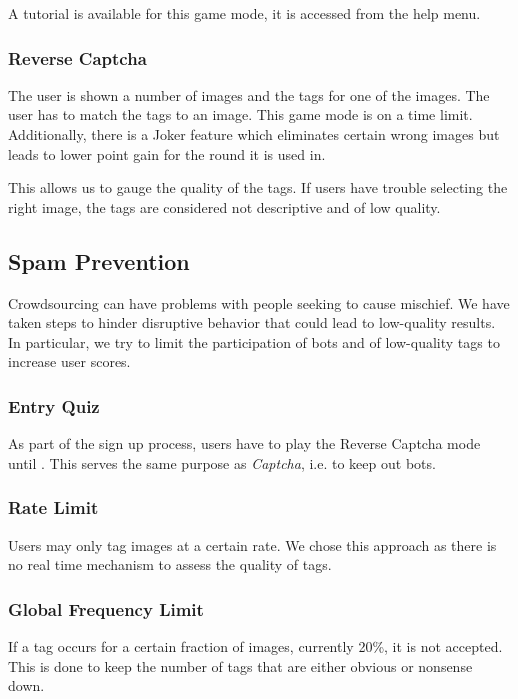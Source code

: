 A tutorial is available for this game mode, it is accessed from the help menu.

\subsubsection{Reverse Captcha}

The user is shown a number of images and the tags for one of the images. The user has to match the tags to an image.
This game mode is on a time limit. Additionally, there is a Joker feature which eliminates certain wrong images but leads to lower point gain for the round it is used in.

This allows us to gauge the quality of the tags. If users have trouble selecting the right image, the tags are considered not descriptive and of low quality.


\subsection{Spam Prevention}

Crowdsourcing can have problems with people seeking to cause mischief. We have taken steps to hinder disruptive behavior that could lead to low-quality results. In particular, we try to limit the participation of bots and  of low-quality tags to increase user scores.


\subsubsection{Entry Quiz}

As part of the sign up process, users have to play the Reverse Captcha mode until . This serves the same purpose as \textit{Captcha}, i.e. to keep out bots.


\subsubsection{Rate Limit}
Users may only tag images at a certain rate. We chose this approach as there is no real time mechanism to assess the quality of tags.

\subsubsection{Global Frequency Limit}
If a tag occurs for a certain fraction of images, currently 20\%, it is not accepted. This is done to keep the number of tags that are either obvious or nonsense down.




